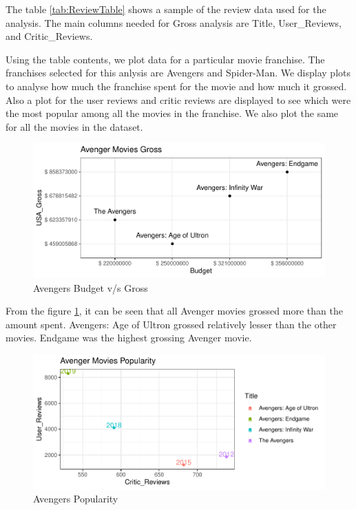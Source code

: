 \documentclass[11pt,a4paper,]{article}
\begin{document}
The table \ref{tab:ReviewTable} shows a sample of the review data used for the analysis. The main columns needed for Gross analysis are Title, User\_Reviews, and Critic\_Reviews.

Using the table contents, we plot data for a particular movie franchise. The franchises selected for this anlysis are Avengers and Spider-Man. We display plots to analyse how much the franchise spent for the movie and how much it grossed. Also a plot for the user reviews and critic reviews are displayed to see which were the most popular among all the movies in the franchise. We also plot the same for all the movies in the dataset.

\begin{figure}[H]

{\centering \includegraphics{Report_files/figure-latex/AvengersGross-1} 

}

\caption{Avengers Budget v/s Gross}\label{fig:AvengersGross}
\end{figure}

From the figure \ref{fig:AvengersGross}, it can be seen that all Avenger movies grossed more than the amount spent. Avengers: Age of Ultron grossed relatively lesser than the other movies. Endgame was the highest grossing Avenger movie.

\begin{figure}[H]

{\centering \includegraphics{Report_files/figure-latex/AvengersReview-1} 

}

\caption{Avengers Popularity}\label{fig:AvengersReview}
\end{figure}
\end{document}
